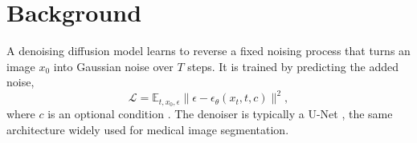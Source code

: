 \chapter{Background}
\label{ch:background}

A denoising diffusion model learns to reverse a fixed noising process that turns an image $x_0$
into Gaussian noise over $T$ steps. It is trained by predicting the added noise,
\begin{equation}
  \mathcal{L} = \mathbb{E}_{t, x_0, \epsilon}\bigl\|\epsilon - \epsilon_\theta(x_t, t, c)\bigr\|^2 ,
  \label{eq:ddpm}
\end{equation}
where $c$ is an optional condition \citep{ho2020}. The denoiser is typically a U-Net
\citep{ronneberger2015}, the same architecture widely used for medical image segmentation.
